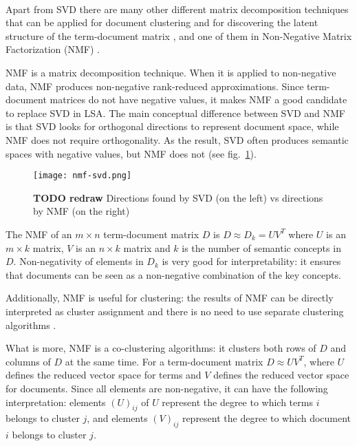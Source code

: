 \ \\

Apart from SVD there are many other different matrix decomposition
techniques that can be applied for document clustering and for discovering
the latent structure of the term-document matrix \cite{osinski2006improving},
and one of them in Non-Negative Matrix Factorization (NMF) \cite{lee1999nnmf}.


NMF is a matrix decomposition technique. When it is applied to non-negative
data, NMF produces non-negative rank-reduced approximations.
Since term-document matrices do not have negative values, it makes
NMF a good candidate to replace SVD in LSA. The main conceptual difference
between SVD and NMF is that SVD looks for orthogonal directions to
represent document space, while NMF does not require orthogonality.
As the result, SVD often produces semantic spaces with negative values,
but NMF does not \cite{xu2003document} (see fig.~\ref{fig:nmf-svd}).


\begin{figure}[h]
\centering\texttt{[image: nmf-svd.png]}
\caption{\textbf{TODO redraw} Directions found by  SVD (on the left) vs directions by NMF (on the right)}
\label{fig:nmf-svd}
\end{figure}


The NMF of an $m \times n$ term-document matrix $D$ is $D \approx D_k = U  V^T$
where $U$ is an $m \times k$ matrix, $V$ is an $n \times k$ matrix and
$k$ is the number of semantic concepts in $D$.
Non-negativity of elements in $D_k$ is very good for interpretability: it
ensures that documents can be seen as a non-negative combination of
the key concepts.


Additionally, NMF is useful for clustering: the results of NMF can
be directly interpreted as cluster assignment and there is no need
to use separate clustering algorithms \cite{xu2003document}.

What is more, NMF is a co-clustering algorithms: it clusters both
rows of $D$ and columns of $D$ at the same time. For a term-document
matrix $D \approx U V^T$, where $U$ defines the reduced vector space for terms
and $V$ defines the reduced vector space for documents. Since all elements
are non-negative, it can have the following interpretation:
elements $(U)_{ij}$ of $U$ represent the degree to which terms $i$ belongs to cluster $j$,
and elements $(V)_{ij}$ represent the degree to which document $i$ belongs to cluster $j$.

\ \\


